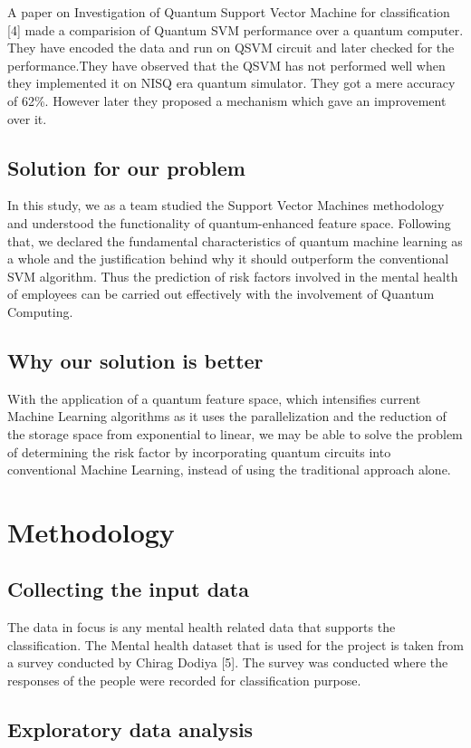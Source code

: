 \documentclass[10pt,journal,compsoc]{IEEEtran}
\begin{document}
\quad A paper on Investigation of Quantum Support Vector Machine for classification [4] made a comparision of Quantum SVM performance over a quantum computer. They have encoded the data and run on QSVM circuit and later checked for the performance.They have observed that the QSVM has not performed well when they implemented it on NISQ era quantum simulator. They got a mere accuracy of 62\%. However later they proposed a mechanism which gave an improvement over it.

\subsection{Solution for our problem}
In this study, we as a team studied the Support Vector Machines methodology and understood the functionality of quantum-enhanced feature space. Following that, we declared the fundamental characteristics of quantum machine learning as a whole and the justification behind why it should outperform the conventional SVM algorithm. Thus the prediction of risk factors involved in the mental health of employees can be carried out effectively with the involvement of Quantum Computing.

\subsection{Why our solution is better}
With the application of a quantum feature space, which intensifies current Machine Learning algorithms as it uses the parallelization and the reduction of the storage space from exponential to linear, we may be able to solve the problem of determining the risk factor by incorporating quantum circuits into conventional Machine Learning, instead of using the traditional approach alone.

\section{Methodology}
\subsection{Collecting the input data}
The data in focus is any mental health related data that supports the classification. The Mental health dataset that is used for the project is taken from a survey conducted by Chirag Dodiya [5]. The survey was conducted where the responses of the people were recorded for classification purpose.

\subsection{Exploratory data analysis}
\end{document}
